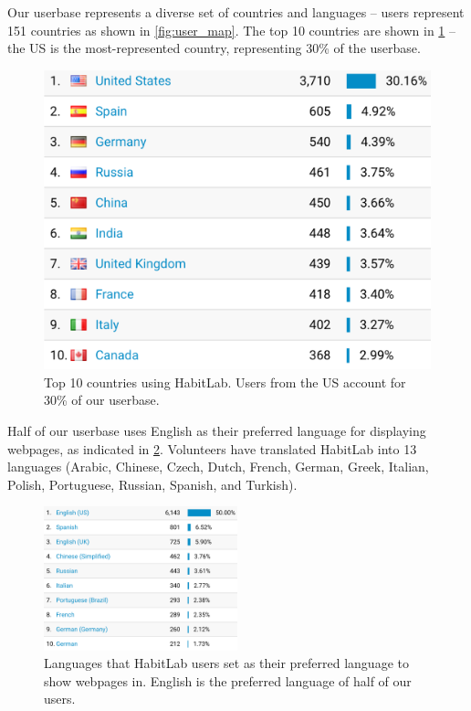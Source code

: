 Our userbase represents a diverse set of countries and languages -- users represent 151 countries as shown in \ref{fig:user_map}. The top 10 countries are shown in \ref{fig:user_countries} -- the US is the most-represented country, representing 30\% of the userbase.

\begin{figure}
\centering
	\includegraphics[height=0.5\textheight]{figuresS/user_countries.png}
	\caption{Top 10 countries using HabitLab. Users from the US account for 30\% of our userbase.}
\label{fig:user_countries}
\end{figure}

Half of our userbase uses English as their preferred language for displaying webpages, as indicated in \ref{fig:user_languages}. Volunteers have translated HabitLab into 13 languages (Arabic, Chinese, Czech, Dutch, French, German, Greek, Italian, Polish, Portuguese, Russian, Spanish, and Turkish).

\begin{figure}
\centering
	\includegraphics[width=0.5\textwidth]{figuresS/user_languages.png}
	\caption{Languages that HabitLab users set as their preferred language to show webpages in. English is the preferred language of half of our users.}
\label{fig:user_languages}
\end{figure}


